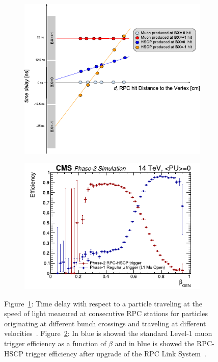 	\begin{figure}[H]
		\begin{subfigure}{0.5\linewidth}
			\centering
			\includegraphics[width = \linewidth]{fig/chapt3/HSCP-RPC-trigger-time.pdf}
			\caption{\label{fig:HSCP-trigger:A}}
		\end{subfigure}
		\begin{subfigure}{0.5\linewidth}
			\centering
			\includegraphics[width = \linewidth]{fig/chapt3/HSCP-RPC-trigger-efficiency.pdf}
			\caption{\label{fig:HSCP-trigger:B}}
		\end{subfigure}
		\caption{\label{fig:HSCP-trigger} Figure~\ref{fig:HSCP-trigger:A}: Time delay with respect to a particle traveling at the speed of light measured at consecutive RPC stations for particles originating at different bunch crossings and traveling at different velocities~\cite{PHASEIITP}. Figure~\ref{fig:HSCP-trigger:B}: In blue is showed the standard Level-1 muon trigger efficiency as a function of $\beta$ and in blue is showed the RPC-HSCP trigger efficiency after upgrade of the RPC Link System~\cite{PHASEIITP}.}
	\end{figure}
	
